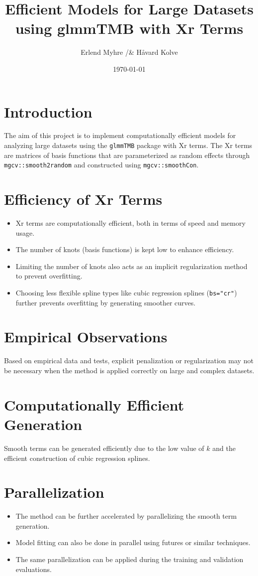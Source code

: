 \documentclass{article}
\title{Efficient Models for Large Datasets using glmmTMB with Xr Terms}
\author{Erlend Myhre /& Håvard Kolve}
\date{\today}
\begin{document}
\maketitle

\section{Introduction}
The aim of this project is to implement computationally efficient models for analyzing large datasets using the \texttt{glmmTMB} package with Xr terms. The Xr terms are matrices of basis functions that are parameterized as random effects through \texttt{mgcv::smooth2random} and constructed using \texttt{mgcv::smoothCon}.

\section{Efficiency of Xr Terms}
\begin{itemize}
    \item Xr terms are computationally efficient, both in terms of speed and memory usage.
    \item The number of knots (basis functions) is kept low to enhance efficiency.
    \item Limiting the number of knots also acts as an implicit regularization method to prevent overfitting.
    \item Choosing less flexible spline types like cubic regression splines (\texttt{bs="cr"}) further prevents overfitting by generating smoother curves.
\end{itemize}

\section{Empirical Observations}
Based on empirical data and tests, explicit penalization or regularization may not be necessary when the method is applied correctly on large and complex datasets.

\section{Computationally Efficient Generation}
Smooth terms can be generated efficiently due to the low value of \(k\) and the efficient construction of cubic regression splines.

\section{Parallelization}
\begin{itemize}
    \item The method can be further accelerated by parallelizing the smooth term generation.
    \item Model fitting can also be done in parallel using futures or similar techniques.
    \item The same parallelization can be applied during the training and validation evaluations.
\end{itemize}
\end{document}
